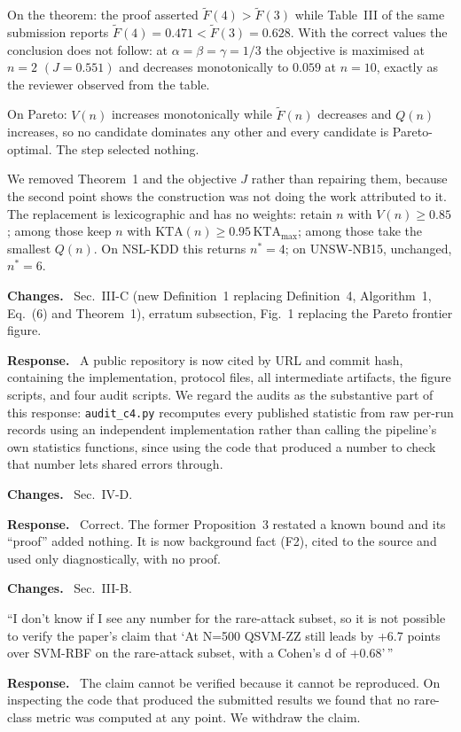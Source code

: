 \documentclass[11pt,a4paper]{article}
\newenvironment{revcomment}
  {\par\addvspace{6pt}\begingroup
   \color{quotegray}\itshape\small
   \begin{list}{}{%
     \setlength{\leftmargin}{1.8em}\setlength{\rightmargin}{1.0em}%
     \setlength{\topsep}{0pt}\setlength{\partopsep}{0pt}%
     \setlength{\parsep}{3pt}\setlength{\itemsep}{0pt}}%
   \item[]}
  {\end{list}\endgroup\normalcolor\addvspace{6pt}}
\newcommand{\itemhead}[2]{%
  \par\addvspace{15pt}%
  \noindent{\bfseries\color{tagink}#1}\hspace{0.7em}{\bfseries #2}%
  \par\addvspace{3.5pt}%
  \noindent{\color{rulegray}\rule{\linewidth}{0.5pt}}%
  \par\addvspace{5pt}%
  \nobreak}
\newcommand{\resp}{\par\addvspace{2pt}\noindent\textbf{Response.}\ }
\newcommand{\changed}{\par\addvspace{5pt}\noindent
  {\bfseries\color{tagink}Changes.}\ }
\begin{document}
On the theorem: the proof asserted $\tilde F(4)>\tilde F(3)$ while Table~III of
the same submission reports $\tilde F(4)=0.471 < \tilde F(3)=0.628$. With the
correct values the conclusion does not follow: at
$\alpha=\beta=\gamma=1/3$ the objective is maximised at $n=2$ $(J=0.551)$ and
decreases monotonically to $0.059$ at $n=10$, exactly as the reviewer observed
from the table.

On Pareto: $V(n)$ increases monotonically while $\tilde F(n)$ decreases and
$Q(n)$ increases, so no candidate dominates any other and every candidate is
Pareto-optimal. The step selected nothing.

We removed Theorem~1 and the objective $J$ rather than repairing them, because
the second point shows the construction was not doing the work attributed to it.
The replacement is lexicographic and has no weights: retain $n$ with
$V(n)\ge0.85$; among those keep $n$ with $\mathrm{KTA}(n)\ge0.95\,\mathrm{KTA}_{\max}$;
among those take the smallest $Q(n)$. On NSL-KDD this returns $n^{\ast}=4$; on
UNSW-NB15, unchanged, $n^{\ast}=6$.
\changed
Sec.~III-C (new Definition~1 replacing Definition~4, Algorithm~1, Eq.~(6) and
Theorem~1), erratum subsection, Fig.~1 replacing the Pareto frontier figure.

\itemhead{R4-3}{Reproducibility is asserted but no machinery is provided}
\resp
A public repository is now cited by URL and commit hash, containing the
implementation, protocol files, all intermediate artifacts, the figure scripts,
and four audit scripts. We regard the audits as the substantive part of this
response: \texttt{audit\_c4.py} recomputes every published statistic from raw
per-run records using an independent implementation rather than calling the
pipeline's own statistics functions, since using the code that produced a number
to check that number lets shared errors through.
\changed
Sec.~IV-D.

\itemhead{R4-4}{Proposition~3 is cited to another paper but not derived}
\resp
Correct. The former Proposition~3 restated a known bound and its ``proof'' added
nothing. It is now background fact (F2), cited to the source and used only
diagnostically, with no proof.
\changed
Sec.~III-B.

\itemhead{R4-5}{No numbers are given for the rare-attack subset, so the
$+6.7$-point claim cannot be verified}
\begin{revcomment}
``I don't know if I see any number for the rare-attack subset, so it is not
possible to verify the paper's claim that `At N=500 QSVM-ZZ still leads by +6.7
points over SVM-RBF on the rare-attack subset, with a Cohen's d of +0.68'\,''
\end{revcomment}
\resp
The claim cannot be verified because it cannot be reproduced. On inspecting the
code that produced the submitted results we found that no rare-class metric was
computed at any point. We withdraw the claim.
\end{document}
